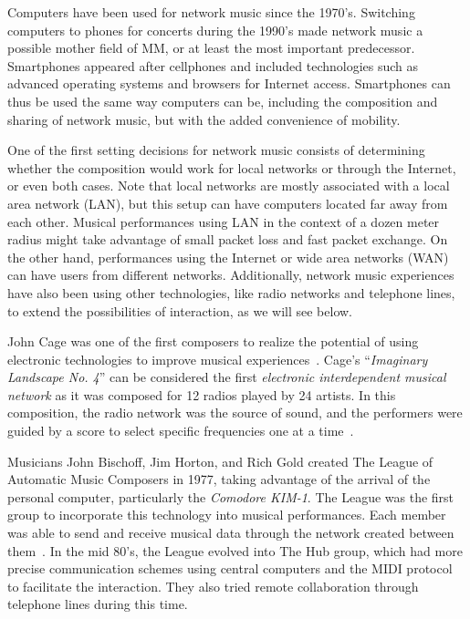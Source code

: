 Computers have been used for network music since the 1970's.
Switching computers to phones for concerts during the 1990's made network music a possible mother field of MM, or at least the most important predecessor.
Smartphones appeared after cellphones and included technologies such as advanced operating systems and browsers for Internet access.
Smartphones can thus be used the same way computers can be, including the composition and sharing of network music, but with the added convenience of mobility.

One of the first setting decisions for network music consists of determining whether the composition would work for local networks or through the Internet, or even both cases.
Note that local networks are mostly associated with a local area network (LAN), but this setup can have computers located far away from each other.
Musical performances using LAN in the context of a dozen meter radius might take advantage of small packet loss and fast packet exchange.
On the other hand, performances using the Internet or wide area networks (WAN) can have users from different networks.
Additionally, network music experiences have also been using other technologies, like radio networks and telephone lines, to extend the possibilities of interaction, as we will see below.

John Cage was one of the first composers to realize the potential of using electronic technologies to improve musical experiences~\citep[p.~16-17]{Weinberg2003}.
Cage's ``\textit{Imaginary Landscape No. 4}'' can be considered the first \textit{electronic interdependent musical network} as it was composed for 12 radios played by 24 artists.
In this composition, the radio network was the source of sound, and the performers were guided by a score to select specific frequencies one at a time~\citep[p.~24-25]{Weinberg2003}. 

Musicians John Bischoff, Jim Horton, and Rich Gold created The League of Automatic Music Composers in 1977, taking advantage of the arrival of the personal computer, particularly the \textit{Comodore KIM-1}.
The League was the first group to incorporate this technology into musical performances.
Each member was able to send and receive musical data through the network created between them~\citep[p.~29]{Weinberg2003}.
In the mid 80's, the League evolved into The Hub group, which had more precise communication schemes using central computers and the MIDI protocol to facilitate the interaction.
They also tried remote collaboration through telephone lines during this time.

